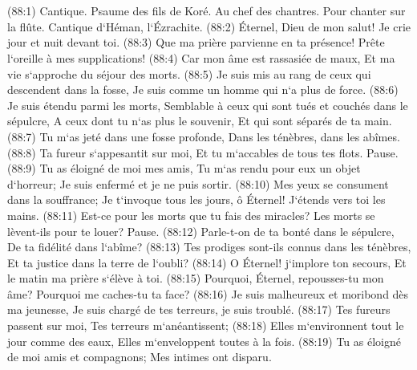 \chapter{}

\verse (88:1) Cantique. Psaume des fils de Koré. Au chef des chantres. Pour chanter sur la flûte. Cantique d`Héman, l`Ézrachite. (88:2) Éternel, Dieu de mon salut! Je crie jour et nuit devant toi. 
\verse (88:3) Que ma prière parvienne en ta présence! Prête l`oreille à mes supplications! 
\verse (88:4) Car mon âme est rassasiée de maux, Et ma vie s`approche du séjour des morts. 
\verse (88:5) Je suis mis au rang de ceux qui descendent dans la fosse, Je suis comme un homme qui n`a plus de force. 
\verse (88:6) Je suis étendu parmi les morts, Semblable à ceux qui sont tués et couchés dans le sépulcre, A ceux dont tu n`as plus le souvenir, Et qui sont séparés de ta main. 
\verse (88:7) Tu m`as jeté dans une fosse profonde, Dans les ténèbres, dans les abîmes. 
\verse (88:8) Ta fureur s`appesantit sur moi, Et tu m`accables de tous tes flots. Pause. 
\verse (88:9) Tu as éloigné de moi mes amis, Tu m`as rendu pour eux un objet d`horreur; Je suis enfermé et je ne puis sortir. 
\verse (88:10) Mes yeux se consument dans la souffrance; Je t`invoque tous les jours, ô Éternel! J`étends vers toi les mains. 
\verse (88:11) Est-ce pour les morts que tu fais des miracles? Les morts se lèvent-ils pour te louer? Pause. 
\verse (88:12) Parle-t-on de ta bonté dans le sépulcre, De ta fidélité dans l`abîme? 
\verse (88:13) Tes prodiges sont-ils connus dans les ténèbres, Et ta justice dans la terre de l`oubli? 
\verse (88:14) O Éternel! j`implore ton secours, Et le matin ma prière s`élève à toi. 
\verse (88:15) Pourquoi, Éternel, repousses-tu mon âme? Pourquoi me caches-tu ta face? 
\verse (88:16) Je suis malheureux et moribond dès ma jeunesse, Je suis chargé de tes terreurs, je suis troublé. 
\verse (88:17) Tes fureurs passent sur moi, Tes terreurs m`anéantissent; 
\verse (88:18) Elles m`environnent tout le jour comme des eaux, Elles m`enveloppent toutes à la fois. 
\verse (88:19) Tu as éloigné de moi amis et compagnons; Mes intimes ont disparu. 

\chapter{}

